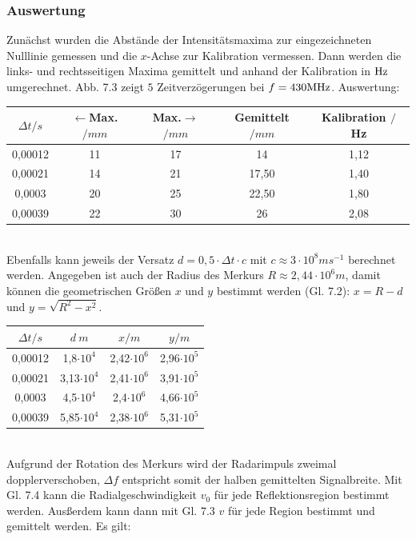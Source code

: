 \documentclass[12pt]{article}
\begin{document}
\subsubsection*{Auswertung}
Zunächst wurden die Abstände der Intensitätsmaxima zur eingezeichneten Nulllinie gemessen und die $x$-Achse zur Kalibration vermessen. Dann werden die links- und rechtsseitigen Maxima gemittelt und anhand der Kalibration in $\textnormal{Hz}$ umgerechnet. Abb. 7.3 zeigt $5$ Zeitverzögerungen bei $f=430\textnormal{MHz}$. Auswertung:
\begin{table}[!ht]
    \centering
    \begin{tabular}{c|c|c|c|c}
        $\Delta t / s$ & $\leftarrow$Max. $/ mm$ & Max.$\rightarrow$ $/ mm$ & Gemittelt $/mm$ & Kalibration $/$ Hz \\ \hline
        0,00012 & 11 & 17 & 14 & 1,12 \\
        0,00021 & 14 & 21 & 17,50 & 1,40 \\ 
        0,0003 & 20 & 25 & 22,50 & 1,80 \\ 
        0,00039 & 22 & 30 & 26 & 2,08 \\ 
    \end{tabular}
\end{table}\\
Ebenfalls kann jeweils der Versatz $\displaystyle d = 0,5\cdot\Delta t \cdot c$ mit $c \approx 3 \cdot 10^8 ms^{-1}$ berechnet werden. Angegeben ist auch der Radius des Merkurs $R \approx 2,44 \cdot 10^6 m$, damit können die geometrischen Größen $x$ und $y$ bestimmt werden (Gl. 7.2): $x = R - d$ und $y= \sqrt{R^2-x^2}$.\\
\begin{table}[!ht]
    \centering
    \begin{tabular}{c|c|c|c}
        $\Delta t / s$ & $d \ m$ & $x / m$ & $y / m$ \\ \hline
        0,00012 & 1,8$\cdot 10^{4}$ & 2,42$\cdot 10^{6}$ & 2,96$\cdot 10^{5}$ \\ 
        0,00021 & 3,13$\cdot 10^{4}$ & 2,41$\cdot 10^{6}$ & 3,91$\cdot 10^{5}$ \\ 
        0,0003 & 4,5$\cdot 10^{4}$ & 2,4$\cdot 10^{6}$ & 4,66$\cdot 10^{5}$ \\ 
        0,00039 & 5,85$\cdot 10^{4}$ & 2,38$\cdot 10^{6}$ & 5,31$\cdot 10^{5}$ \\ 
    \end{tabular}
\end{table}\\
Aufgrund der Rotation des Merkurs wird der Radarimpuls zweimal dopplerverschoben, $\Delta f$ entspricht somit der halben gemittelten Signalbreite. Mit Gl. 7.4 kann die Radialgeschwindigkeit $v_0$ für jede Reflektionsregion bestimmt werden. Ausßerdem kann dann mit Gl. 7.3 $v$ für jede Region bestimmt und gemittelt werden. Es gilt:
\end{document}
